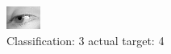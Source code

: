 \begin{figure}[h!]
\begin{center}
\includegraphics[width=0.60\columnwidth]{figures/ID2918_class_3_target_4.png}
\end{center}
\caption{ Classification: 3 actual target: 4}
\label{fig:ID2918_class_3_target_4}
\end{figure}
